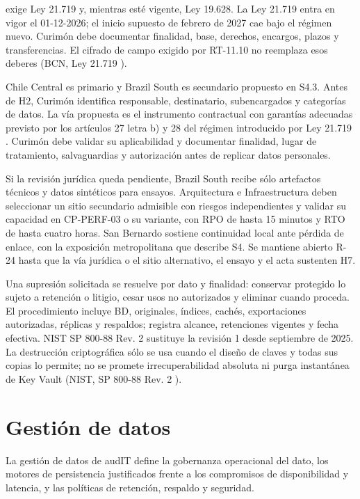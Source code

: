  exige Ley 21.719 y, mientras esté vigente, Ley 19.628. La Ley 21.719 entra en vigor el 01-12-2026; el inicio supuesto de febrero de 2027 cae bajo el régimen nuevo. Curimón debe documentar finalidad, base, derechos, encargos, plazos y transferencias. El cifrado de campo exigido por RT-11.10 no reemplaza esos deberes (BCN, Ley 21.719 \parencite{d3_ley21719}).

Chile Central es primario y Brazil South es secundario propuesto en S4.3. Antes de H2, Curimón identifica responsable, destinatario, subencargados y categorías de datos. La vía propuesta es el instrumento contractual con garantías adecuadas previsto por los artículos 27 letra b) y 28 del régimen introducido por Ley 21.719 \parencite{d3_ley21719}. Curimón debe validar su aplicabilidad y documentar finalidad, lugar de tratamiento, salvaguardias y autorización antes de replicar datos personales.

Si la revisión jurídica queda pendiente, Brazil South recibe sólo artefactos técnicos y datos sintéticos para ensayos. Arquitectura e Infraestructura deben seleccionar un sitio secundario admisible con riesgos independientes y validar su capacidad en CP-PERF-03 o su variante, con RPO de hasta 15 minutos y RTO de hasta cuatro horas. San Bernardo sostiene continuidad local ante pérdida de enlace, con la exposición metropolitana que describe S4. Se mantiene abierto R-24 hasta que la vía jurídica o el sitio alternativo, el ensayo y el acta sustenten H7.

Una supresión solicitada se resuelve por dato y finalidad: conservar protegido lo sujeto a retención o litigio, cesar usos no autorizados y eliminar cuando proceda. El procedimiento incluye BD, originales, índices, cachés, exportaciones autorizadas, réplicas y respaldos; registra alcance, retenciones vigentes y fecha efectiva. NIST SP 800-88 Rev. 2 sustituye la revisión 1 desde septiembre de 2025. La destrucción criptográfica sólo se usa cuando el diseño de claves y todas sus copias lo permite; no se promete irrecuperabilidad absoluta ni purga instantánea de Key Vault (NIST, SP 800-88 Rev. 2 \parencite{d3_nist88r2}).

\section{Gestión de datos}\label{sec:5-gestion-datos}\label{sec:05-gestion-de-datos}

La gestión de datos de audIT define la gobernanza operacional del dato, los motores de persistencia justificados frente a los compromisos de disponibilidad y latencia, y las políticas de retención, respaldo y seguridad.

